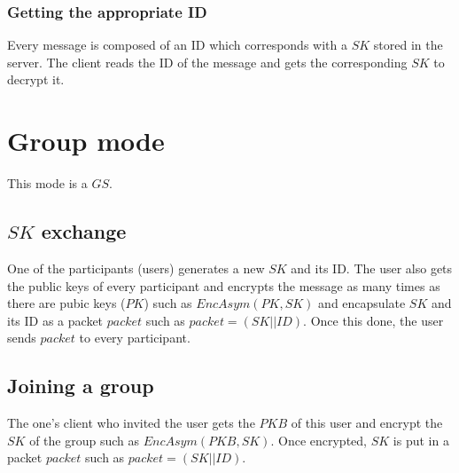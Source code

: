 \documentclass[a4paper,10pt]{article}
\begin{document}
\subsubsection{Getting the appropriate ID}
Every message is composed of an ID which corresponds with a $SK$ stored in the server. The client reads the ID of the message and gets the corresponding $SK$ to decrypt it.

\section{Group mode}
This mode is a $GS$.
\subsection{$SK$ exchange}
One of the participants (users) generates a new $SK$ and its ID. The user also gets the public keys of every participant and encrypts the message as many times as there are pubic keys ($PK$) such as $EncAsym(PK, SK)$ and encapsulate $SK$ and its ID as a packet $packet$ such as $packet=(SK||ID)$. Once this done, the user sends $packet$ to every participant.
\subsection{Joining a group}
The one's client who invited the user gets the $PKB$ of this user and encrypt the $SK$ of the group such as $EncAsym(PKB,SK)$. Once encrypted, $SK$ is put in a packet $packet$ such as $packet=(SK||ID)$.
\end{document}
